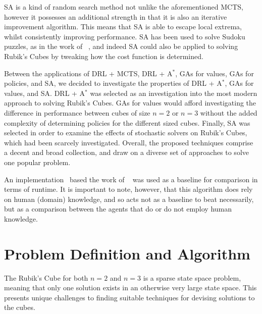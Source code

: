 \documentclass[UKenglish]{svproc}
\begin{document}
SA is a kind of random search method not unlike the aforementioned MCTS, however it possesses an additional strength in that it is also an iterative improvement algorithm. This means that SA is able to escape local extrema, whilst consistently improving performance. SA has been used to solve Sudoku puzzles, as in the work of \citeauthor{SAarticle}~\autocite{SAarticle}, and indeed SA could also be applied to solving Rubik's Cubes by tweaking how the cost function is determined.

Between the applications of DRL + MCTS, DRL + A$^\ast$, GAs for values, GAs for policies, and SA, we decided to investigate the properties of DRL + A$^{\ast}$, GAs for values, and SA. DRL + A$^\ast$ was selected as an investigation into the most modern approach to solving Rubik's Cubes. GAs for values would afford investigating the difference in performance between cubes of size $n=2$ or $n=3$ without the added complexity of determining policies for the different sized cubes. Finally, SA was selected in order to examine the effects of stochastic solvers on Rubik's Cubes, which had been scarcely investigated. Overall, the proposed techniques comprise a decent and broad collection, and draw on a diverse set of approaches to solve one popular problem.

An implementation~\cite{Shoukat2019} based the work of \citeauthor{KORF198597}~\autocite{KORF198597} was used as a baseline for comparison in terms of runtime. It is important to note, however, that this algorithm does rely on human (domain) knowledge, and so acts not as a baseline to beat necessarily, but as a comparison between the agents that do or do not employ human knowledge.


\section{Problem Definition and Algorithm}
The Rubik's Cube for both $n=2$ and $n=3$ is a sparse state space problem, meaning that only one solution exists in an otherwise very large state space. This presents unique challenges to finding suitable techniques for devising solutions to the cubes.
\end{document}
